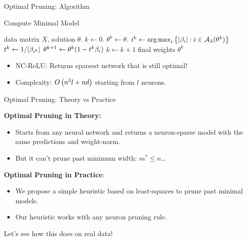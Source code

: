 \documentclass[usenames,dvipsnames,mathserif,notheorems]{beamer}
\newcommand{\bad}[1]{\textcolor{bad}{#1}}
\newcommand{\good}[1]{\textcolor{good}{#1}}
\begin{document}
\begin{frame}{Optimal Pruning: Algorithm}
	\begin{algorithm}[H]
		\caption{Compute Minimal Model}
		\begin{algorithmic}
			 data matrix \( X \), solution \( \theta \).
			\STATE \( k \gets 0 \).
			\STATE \( \theta^k \gets \theta \).
			\WHILE {\( \exists \beta \neq 0 \) s.t. \( \good{\sum_{\bi \in \act(\theta^k)} \beta_\bi D_i X \theta_i^k = 0} \)}
			\STATE \( {i}^k \gets \mathop{\rm arg\,max}_{{i}} \left\{|\beta_{i}| : {i} \in {\mathcal{A}_{\lambda}}(\theta^k)\right\}  \)
			\STATE \( t^k \gets 1/|\beta_{{i}^k}| \)
			\STATE \( \theta^{k+1} \gets \theta^k (1 - t^k \beta_{i}) \)
			\STATE \( k \gets k + 1 \)
			\ENDWHILE
			 final weights \( \theta^k \)
		\end{algorithmic}
	\end{algorithm}

	\pause
	\begin{itemize}
		\item \bad{NC-ReLU}: Returns \good{sparsest network} that is still optimal!
		      \pause
		\item Complexity: \( O\left(n^3 l + nd\right) \) starting from \( l \) neurons.
	\end{itemize}

\end{frame}

\begin{frame}{Optimal Pruning: Theory vs Practice}

	\textbf{Optimal Pruning in Theory:}
	\begin{itemize}
		\item Starts from any neural network and returns a \good{neuron-sparse} model
		      with the same \good{predictions} and \good{weight-norm}.
		      \pause

		\item But it can't prune past minimum width: \bad{\( m^* \leq n \)}\ldots
	\end{itemize}

	\vspace{2em}
	\pause

	\textbf{Optimal Pruning in Practice}:
	\begin{itemize}
		\item We propose a \good{simple heuristic} based on least-squares to prune
		      past minimal models.
		      \pause

		\item Our heuristic works with \good{any neuron pruning rule}.
	\end{itemize}

	\vspace{1em}
	\pause

	\begin{center}
		\Large
		Let's see how this does on real data!
	\end{center}

\end{frame}
\end{document}
